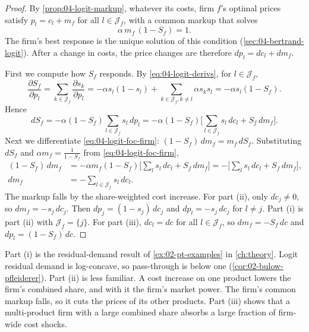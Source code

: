 \begin{proof}
By \cref{prop:04-logit-markup}, whatever its costs, firm $f$'s optimal prices satisfy $p_l = c_l + m_f$ for all
$l \in \mathcal{J}_f$, with a common markup that solves
\begin{equation}\label{eq:04-logit-foc-firm}
\alpha\, m_f\,(1 - S_f) = 1 .
\end{equation}
The firm's best response is the unique solution of this condition (\cref{sec:04-bertrand-logit}). After a change
in costs, the price changes are therefore $dp_l = dc_l + dm_f$.

First we compute how $S_f$ responds. By \eqref{eq:04-logit-derivs}, for $l \in \mathcal{J}_f$,
\begin{equation*}
\frac{\partial S_f}{\partial p_l} = \sum_{k \in \mathcal{J}_f}\frac{\partial s_k}{\partial p_l}
= -\alpha s_l(1 - s_l) + \sum_{k \in \mathcal{J}_f, k \neq l}\alpha s_k s_l = -\alpha s_l(1 - S_f).
\end{equation*}
Hence
\begin{equation*}
dS_f = -\alpha(1 - S_f)\sum_{l \in \mathcal{J}_f}s_l\,dp_l
= -\alpha(1 - S_f)\Big[\sum_{l \in \mathcal{J}_f}s_l\,dc_l + S_f\,dm_f\Big].
\end{equation*}
Next we differentiate \eqref{eq:04-logit-foc-firm}: $(1 - S_f)\,dm_f = m_f\,dS_f$. Substituting $dS_f$ and
$\alpha m_f = \frac{1}{1 - S_f}$ from \eqref{eq:04-logit-foc-firm},
\begin{align*}
(1 - S_f)\,dm_f &= -\alpha m_f(1 - S_f)\Big[\sum_{l}s_l\,dc_l + S_f\,dm_f\Big]
                 = -\Big[\sum_{l}s_l\,dc_l + S_f\,dm_f\Big], \\
dm_f &= -\sum_{l \in \mathcal{J}_f}s_l\,dc_l .
\end{align*}
The markup falls by the share-weighted cost increase. For part (ii), only $dc_j \neq 0$, so $dm_f = -s_j\,dc_j$.
Then $dp_j = (1 - s_j)\,dc_j$ and $dp_l = -s_j\,dc_j$ for $l \neq j$. Part (i) is part (ii) with
$\mathcal{J}_f = \{j\}$. For part (iii), $dc_l = dc$ for all $l \in \mathcal{J}_f$, so $dm_f = -S_f\,dc$ and
$dp_l = (1 - S_f)\,dc$.
\end{proof}

Part (i) is the residual-demand result of \cref{ex:02-pt-examples} in \cref{ch:theory}. Logit residual demand is
log-concave, so pass-through is below one (\cref{cor:02-bulow-pfleiderer}). Part (ii) is less familiar. A cost
increase on one product lowers the firm's combined share, and with it the firm's market power. The firm's common
markup falls, so it cuts the prices of its other products. Part (iii) shows that a multi-product firm with a large
combined share absorbs a large fraction of firm-wide cost shocks.

